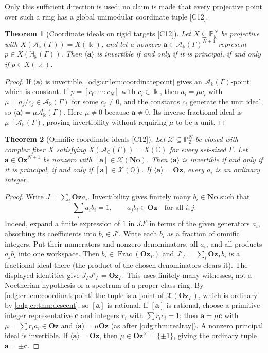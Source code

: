 \documentclass[11pt,oneside]{article}
\numberwithin{equation}{section}
\newtheorem{theorem}{Theorem}[section]
\theoremstyle{definition}
\theoremstyle{remark}
\newcommand{\No}{\mathbf{No}}
\newcommand{\Oz}{\mathbf{Oz}}
\newcommand{\Z}{\mathbb Z}
\newcommand{\Q}{\mathbb Q}
\newcommand{\C}{\mathbb C}
\newcommand{\Frac}{\operatorname{Frac}}
\newcommand{\src}[1]{\textup{\textsf{\small[#1]}}}
\newcommand{\crH}{\mathbb H_\Bbbk(\Gamma)}
\newcommand{\crA}{\mathcal A_\Bbbk(\Gamma)}
\begin{document}
Only this sufficient direction is used; no claim is made that every projective
point over such a ring has a global unimodular coordinate tuple \src{C12}.

\begin{theorem}[Coordinate ideals on rigid targets \src{C12}]\label{odg:cr:thm:ideals}
Let $X\subseteq\mathbb P^N_\Bbbk$ be projective with $X(\crA)=X(\Bbbk)$, and let a nonzero
$\mathbf a\in\crA^{N+1}$ represent $p\in X(\crH)$. Then $\langle\mathbf a\rangle$ is
invertible if and only if it is principal, if and only if $p\in X(\Bbbk)$.
\end{theorem}
\begin{proof}
If $\langle\mathbf a\rangle$ is invertible, \cref{odg:cr:lem:coordinatepoint} gives an
$\crA$-point, which is constant. If $p=[c_0:\cdots:c_N]$ with $c_i\in\Bbbk$, then
$a_i=\mu c_i$ with $\mu=a_j/c_j\in\crA$ for some $c_j\ne0$, and the constants $c_i$
generate the unit ideal, so $\langle\mathbf a\rangle=\mu\crA$. Here $\mu\ne0$
because $\mathbf a\ne0$. Its inverse fractional ideal is
$\mu^{-1}\crA$, proving invertibility without requiring $\mu$ to be a unit.
\end{proof}

\begin{theorem}[Omnific coordinate ideals \src{C12}]\label{odg:cr:thm:ozideal}
Let $\mathcal X\subseteq\mathbb P^N_\Z$ be closed with complex fiber $X$ satisfying
$X(\mathcal A_\C(\Gamma))=X(\C)$ for every set-sized $\Gamma$. Let
$\mathbf a\in\Oz^{N+1}$ be nonzero with $[\mathbf a]\in\mathcal X(\No)$. Then
$\langle\mathbf a\rangle$ is invertible if and only if it is principal, if and only if
$[\mathbf a]\in\mathcal X(\Q)$. If $\langle\mathbf a\rangle=\Oz$, every $a_i$ is an
ordinary integer.
\end{theorem}
\begin{proof}
Write $J=\sum_i\Oz a_i$. Invertibility gives finitely many
$b_i\in\No$ such that
\[
 \sum_i a_i b_i=1,\qquad a_jb_i\in\Oz\quad\text{for all }i,j.
\]
Indeed, expand a finite expression of $1$ in $JJ'$ in terms of the given
generators $a_i$, absorbing its coefficients into $b_i\in J'$.
Write each $b_i$ as a fraction of omnific integers. Put their numerators and
nonzero denominators, all $a_i$, and all products $a_jb_i$ into one workspace.
Then $b_i\in\Frac(\Oz_\Gamma)$ and
$J'_{\Gamma}=\sum_i\Oz_\Gamma b_i$ is a fractional ideal there (the product
of the chosen denominators clears it). The displayed identities give
$J_\Gamma J'_\Gamma=\Oz_\Gamma$. This uses finitely many witnesses, not a
Noetherian hypothesis or a spectrum of a proper-class ring. By
\cref{odg:cr:lem:coordinatepoint} the tuple is a point of $\mathcal X(\Oz_\Gamma)$,
which is ordinary by \cref{odg:cr:thm:descent}; so $[\mathbf a]$ is rational. If
$[\mathbf a]$ is rational, choose a primitive integer representative $\mathbf c$ and
integers $r_i$ with $\sum r_ic_i=1$; then $\mathbf a=\mu\mathbf c$ with
$\mu=\sum r_ia_i\in\Oz$ and $\langle\mathbf a\rangle=\mu\Oz$ (as after
\cref{odg:thm:realray}). A nonzero principal ideal is invertible. If
$\langle\mathbf a\rangle=\Oz$, then $\mu\in\Oz^\times=\{\pm1\}$, giving the
ordinary tuple $\mathbf a=\pm\mathbf c$.
\end{proof}
\end{document}
